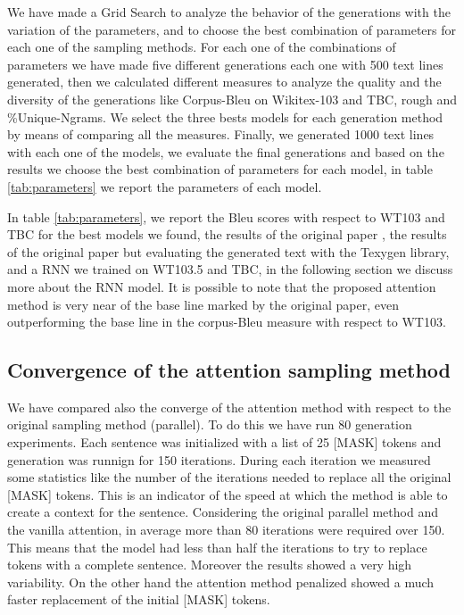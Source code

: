 \documentclass[10pt,twocolumn,letterpaper]{article}
\begin{document}

We have made a Grid Search to analyze the behavior of the generations with the variation of the parameters,
and to choose the best combination of parameters for each one of the sampling methods. For each one of the
combinations of parameters we have made five different generations each one with 500 text lines generated,
then we calculated different measures to analyze the quality and the diversity of the generations like
Corpus-Bleu on Wikitex-103 and TBC, rough and \%Unique-Ngrams. We select the three bests models for each
generation method by means of comparing all the measures. Finally, we generated 1000 text lines with each one
of the models, we evaluate the final generations and based on the results we choose the best combination of
parameters for each model, in table \ref{tab:parameters} we report the parameters of each model.

In table \ref{tab:parameters}, we report the Bleu scores with respect to WT103 and TBC for the best models we found,
the results of the original paper \cite{wang2019bert}, the results of the original paper but evaluating the generated
text with the Texygen library, and a RNN we trained on WT103.5 and TBC, in the following section we discuss more about
the RNN model. It is possible to note that the proposed attention method is very near of the base line marked by the
original paper, even outperforming the base line in the corpus-Bleu measure with respect to WT103.

\subsection{Convergence of the attention sampling method}
We have compared also the converge of the attention method with respect to the original sampling method (parallel).
To do this we have run 80 generation experiments. Each sentence was initialized with a list of 25 [MASK] tokens and
generation was runnign for 150 iterations. During each iteration we measured some statistics like the number of the
iterations needed to replace all the original [MASK] tokens. This is an indicator of the speed at which the method is able to create
a context for the sentence. Considering the original parallel method and the vanilla attention, in average more than 80
iterations were required over 150. This means that the model had less than half the iterations to try to replace tokens
with a complete sentence. Moreover the results showed a very high variability.
On the other hand the attention method penalized showed a much faster replacement of the initial [MASK] tokens.
\begin{figure}[t!]
   \centering
   
   \caption{
   }
   \label{fig:ReplaceMask}
\end{figure}
\end{document}
